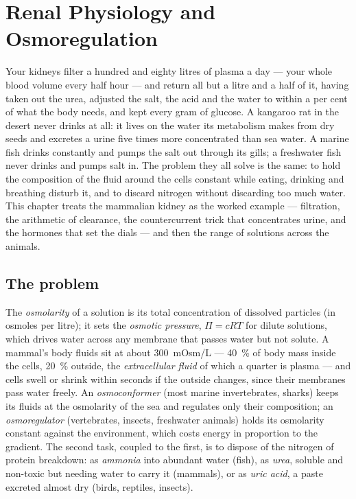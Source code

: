 \chapter{Renal Physiology and Osmoregulation}\label{ch:b3:renal-osmoregulation}

Your kidneys filter a hundred and eighty litres of plasma a day ---
your whole blood volume every half hour --- and return all but a litre
and a half of it, having taken out the urea, adjusted the salt, the
acid and the water to within a per cent of what the body needs, and
kept every gram of glucose. A kangaroo rat in the desert never drinks
at all: it lives on the water its metabolism makes from dry seeds and
excretes a urine five times more concentrated than sea water. A
marine fish drinks constantly and pumps the salt out through its
gills; a freshwater fish never drinks and pumps salt in. The problem
they all solve is the same: to hold the composition of the fluid
around the cells constant while eating, drinking and breathing
disturb it, and to discard nitrogen without discarding too much
water. This chapter treats the mammalian kidney as the worked
example --- filtration, the arithmetic of clearance, the countercurrent
trick that concentrates urine, and the hormones that set the
dials --- and then the range of solutions across the animals.

\section{The problem}

\begin{definition}[Osmoregulation]\label{def:b3:renal-osmoregulation:problem}
The \emph{osmolarity} of a solution is its total concentration of
dissolved particles (in osmoles per litre); it sets the \emph{osmotic
pressure}, $\Pi = cRT$ for dilute solutions, which drives water across
any membrane that passes water but not solute. A mammal's body fluids
sit at about \qty{300}{mOsm/L} --- \qty{40}{\%} of body mass inside the
cells, \qty{20}{\%} outside, the \emph{extracellular fluid} of which a
quarter is plasma --- and cells swell or shrink within seconds if the
outside changes, since their membranes pass water freely. An
\emph{osmoconformer} (most marine invertebrates, sharks) keeps its
fluids at the osmolarity of the sea and regulates only their
composition; an \emph{osmoregulator} (vertebrates, insects,
freshwater animals) holds its osmolarity constant against the
environment, which costs energy in proportion to the gradient. The
second task, coupled to the first, is to dispose of the nitrogen of
protein breakdown: as \emph{ammonia} into abundant water (fish), as
\emph{urea}, soluble and non-toxic but needing water to carry it
(mammals), or as \emph{uric acid}, a paste excreted almost dry (birds,
reptiles, insects).
\end{definition}

